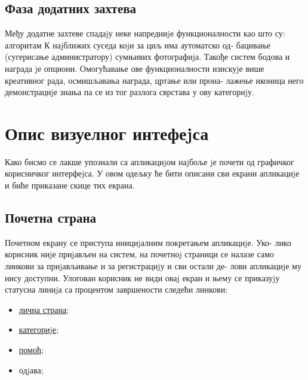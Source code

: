 \documentclass[a4paper]{article}
\begin{document}
\subsection{Фаза додатних захтева}
Међу додатне захтеве спадаjу неке напредниjе функционалности као
што су: алгоритам К наjближих суседа коjи за циљ има аутоматско од-
бацивање (сугерисање администратору) сумњивих фотографиjа. Такође
систем бодова и награда jе опциони. Омогућавање ове функционалности
изискуjе више креативног рада, осмишљавања награда, цртање или прона-
лажење иконица него демонстрациjе знања па се из тог разлога сврстава у
ову категориjу.

\section{Опис визуелног интефеjса}
Како бисмо се лакше упознали са апликациjом наjбоље jе почети од
графичког корисничког интерфеjса. У овом одељку ће бити описани сви
екрани апликациjе и биће приказане скице тих екрана.

\subsection{Почетна страна}
Почетном екрану се приступа инициjалним покретањем апликациjе. Уко-
лико корисник ниjе приjављен на систем, на почетноj страници се налазе
само линкови за приjављивање и за регистрациjу и сви остали де-
лови апликациjе му нису доступни. Улогован корисник не види оваj екран
и њему се приказуjу статусна линиjа са процентом завршености следећи
линкови:
\begin{itemize}
	\item \hyperref[personal]{лична страна};
	\item \hyperref[categories]{категориjе};
	\item \hyperref[help]{помоћ};
	\item одjава;
\end{itemize}
\end{document}
